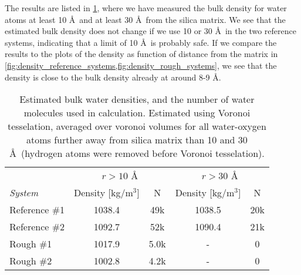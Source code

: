 The results are listed in \cref{tab:bulk_water_density}, where we have measured the bulk density for water atoms at least 10 \AA\ and at least 30 \AA\ from the silica matrix. We see that the estimated bulk density does not change if we use 10 or 30 \AA\ in the two reference systems, indicating that a limit of 10 \AA\ is probably safe. If we compare the results to the plots of the density as function of distance from the matrix in \cref{fig:density_reference_systems,fig:density_rough_systems}, we see that the density is close to the bulk density already at around 8-9 \AA.
%
\begin{table}[!htb]%
    \centering%
    \begin{tabular}{l|cc|cc}%
    ~               & \multicolumn{2}{c|}{$r>10$ \AA}& \multicolumn{2}{c}{$r>30$ \AA}    \\
    \textit{System} & Density [kg/m$^3$]    & N     & Density [kg/m$^3$]    & N   \\ \hline
    Reference \#1   & 1038.4                & 49k   & 1038.5                & 20k \\
    Reference \#2   & 1092.7                & 52k   & 1090.4                & 21k \\
    Rough \#1       & 1017.9                & 5.0k  & -                     & 0   \\
    Rough \#2       & 1002.8                & 4.2k  & -                     & 0   \\
    \end{tabular}%
    \vspace{8pt}%
    \caption{%
        Estimated bulk water densities, and the number of water molecules used in calculation. Estimated using Voronoi tesselation, averaged over voronoi volumes for all water-oxygen atoms further away from silica matrix than 10 and 30 \AA\ (hydrogen atoms were removed before Voronoi tesselation). %
        \label{tab:bulk_water_density}%
    }%
\end{table}%
